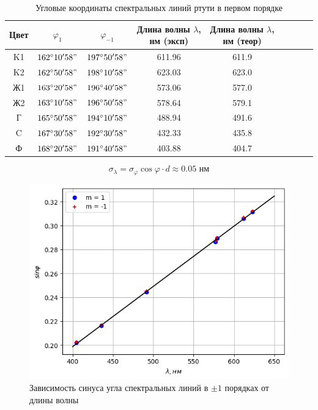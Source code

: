 \begin{table}[h!]
    \centering
    \begin{tabular}{|c|c|c|c|c|c|c|c|c|}
        \hline
        Цвет & $\varphi_{1}$ & $\varphi_{-1}$ & Длина волны $\lambda$, нм (эксп) & Длина волны $\lambda$, нм (теор) \\\hline
        K1   & $162^{\circ}10'58"$ & $197^{\circ}50'58"$ & 611.96 & 611.9 \\\hline
        K2   & $162^{\circ}50'58"$ & $198^{\circ}10'58"$ & 623.03 & 623.0 \\\hline
        Ж1   & $163^{\circ}20'58"$ & $196^{\circ}40'58"$ & 573.06 & 577.0 \\\hline
        Ж2   & $163^{\circ}10'58"$ & $196^{\circ}50'58"$ & 578.64 & 579.1 \\\hline
        Г    & $165^{\circ}50'58"$ & $194^{\circ}10'58"$ & 488.94 & 491.6 \\\hline
        C    & $167^{\circ}30'58"$ & $192^{\circ}30'58"$ & 432.33 & 435.8 \\\hline
        Ф    & $168^{\circ}20'58"$ & $191^{\circ}40'58"$ & 403.88 & 404.7 \\\hline
    \end{tabular}
    \caption{Угловые координаты спектральных линий ртути в первом порядке}
\end{table}

$$\sigma_{\lambda} = \sigma_{\varphi} \cos\varphi \cdot d \approx 0.05 \text{ нм}$$

\begin{figure}[h!]
    \centering
    \includegraphics[width=12cm]{images/plot1.png}
    \caption{Зависимость синуса угла спектральных линий в $\pm 1$ порядках от длины волны} \label{fig:plt1}
\end{figure}

